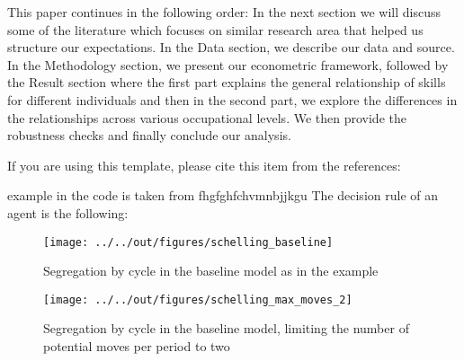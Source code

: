 \documentclass[11pt, a4paper, leqno]{article}
\begin{document}
This paper continues in the following order: In the next section we will discuss some of the literature which focuses on similar research area that helped us structure our expectations. In the Data section, we describe our data and source. In the Methodology section, we present our econometric framework, followed by the Result section where the first part explains the general relationship of skills for different individuals and then in the second part, we explore the differences in the relationships across various occupational levels. We then provide the robustness checks and finally conclude our analysis.

If you are using this template, please cite this item from the references: \citet{GaudeckerEconProjectTemplates}

\citet{Schelling69} example in the code is taken from \citet{StachurskiSargent13}
fhgfghfchvmnbjjkgu
The decision rule of an agent is the following:


\begin{figure}
    \caption{Segregation by cycle in the baseline \citet{Schelling69} model as in the \citet{StachurskiSargent13} example}
    
    \texttt{[image: ../../out/figures/schelling\_baseline]}

\end{figure}


\begin{figure}
    \caption{Segregation by cycle in the baseline \citet{Schelling69} model, limiting the number of potential moves per period to two}
    
    \texttt{[image: ../../out/figures/schelling\_max\_moves\_2]}

\end{figure}





\printbibliography
{}





\end{document}
